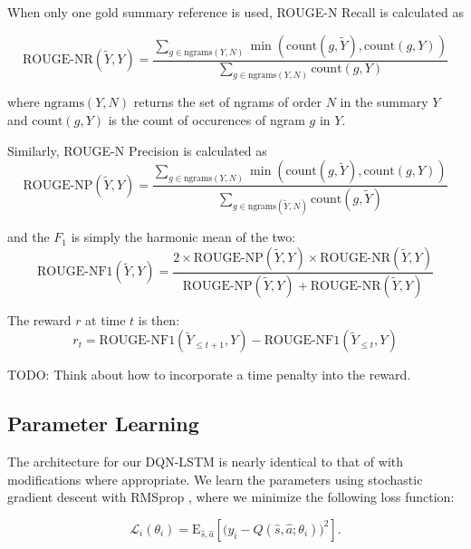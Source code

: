 \documentclass[12pt]{article}
\begin{document}
     
    When only one gold summary reference is used, ROUGE-N Recall is calculated
    as 

    \[ \textrm{ROUGE-NR}(\tilde{Y}, Y) = 
        \frac{\sum_{g \in \textrm{ngrams}(Y,N)} 
        \min \left(\textrm{count}(g, \tilde{Y}), \textrm{count}(g, Y)\right)}{
        \sum_{g \in \textrm{ngrams}(Y,N)} 
        \textrm{count}(g, Y)
        }
    \]

    where $\textrm{ngrams}(Y, N)$ returns the set of ngrams of order $N$ in 
    the summary $Y$ and $\textrm{count}(g, Y)$ is the count of occurences of
    ngram $g$ in $Y.$

    Similarly, ROUGE-N Precision is calculated as 
    \[ \textrm{ROUGE-NP}(\tilde{Y}, Y) = 
        \frac{\sum_{g \in \textrm{ngrams}(Y,N)} 
        \min \left(\textrm{count}(g, \tilde{Y}), \textrm{count}(g, Y)\right)}{
            \sum_{g \in \textrm{ngrams}(\tilde{Y},N)} 
            \textrm{count}(g, \tilde{Y})
        }
    \]

    and the $F_1$ is simply the harmonic mean of the two:
    \[ \textrm{ROUGE-NF1}(\tilde{Y}, Y) = \frac{ 2 \times 
    \textrm{ROUGE-NP}(\tilde{Y}, Y) \times \textrm{ROUGE-NR}(\tilde{Y}, Y)
    }{ \textrm{ROUGE-NP}(\tilde{Y}, Y) + \textrm{ROUGE-NR}(\tilde{Y}, Y) } \]
        


    The reward $r$ at time $t$ is then:
    \[ r_t = \textrm{ROUGE-NF1}(\tilde{Y}_{\le t+1}, Y) - 
    \textrm{ROUGE-NF1}(\tilde{Y}_{\le t}, Y) \]

    TODO: Think about how to incorporate a time penalty into the reward.

\subsection{Parameter Learning}

The architecture for our DQN-LSTM is nearly identical to that of  \cite{narasimhan2015language} with modifications where appropriate. We learn the parameters using stochastic gradient descent with RMSprop \cite{hinton2012lecture}, where we minimize the following loss function: 

\begin{equation}
\mathcal{L}_i(\theta_i) =  \textrm{E}_{\hat{s}, \hat{a}}[ \big (y_i - Q(\hat{s}, \hat{a}; \theta_i) \big )^2].
\end{equation}
\end{document}
